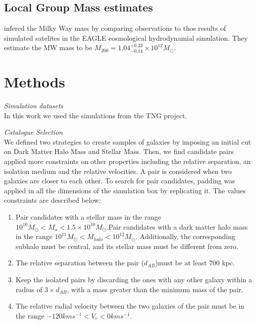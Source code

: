 \documentclass[fleqn,usenatbib]{mnras}
\begin{document}
\subsection{Local Group Mass estimates}

\citep{2018arXiv180810456C} infered the Milky Way mass by comparing
observations to thos results of simulated satelites in the EAGLE
cosmological hydrodynamial simulation. 
They estimate the MW mass to be $M_{200} =
1.04_{-0.14}^{+0.23}\times10^{12}M_{\odot}$. 
\section{Methods}
\textit{Simulation datasets}\\
In this work we used the simulations from the TNG project.


\textit{Catalogue Selection}\\
We defined two strategies to create samples of galaxies by imposing an initial cut on Dark Matter Halo Mass and Stellar Mass. %
Then, we find candidate pairs applied more constraints on other properties including the relative separation, an isolation medium and the relative velocities. A pair is considered when two galaxies are closer to each other. To search for pair candidates, padding was applied in all the dimensions of the simulation box by replicating it. The values constraints are described below:
\begin{enumerate}[i]
  \item Pair candidates with a stellar mass in the range $10^{10}M_\odot <M_\star<1.5\times 10^{10}M_\odot$.Pair candidates with a dark matter halo mass in the range $10^{11}M_\odot<M_{halo}<10^{12}M_\odot$. Additionally, the corresponding subhalo must be central, and its stellar mass must be different from zero. 
  \item The relative separation between the pair ($d_{AB}$)must be at least $700$ kpc. 
  \item Keep the isolated pairs by discarding the ones with any other galaxy within a radius of $3\times d_{AB}$, with a mass greater than the minimum mass of the pair. 
  \item The relative radial velocity between the two galaxies of the pair must be in the range $-120 km s^{-1}<V_r<0 km s^{-1}$. 
\end{enumerate}
\end{document}
